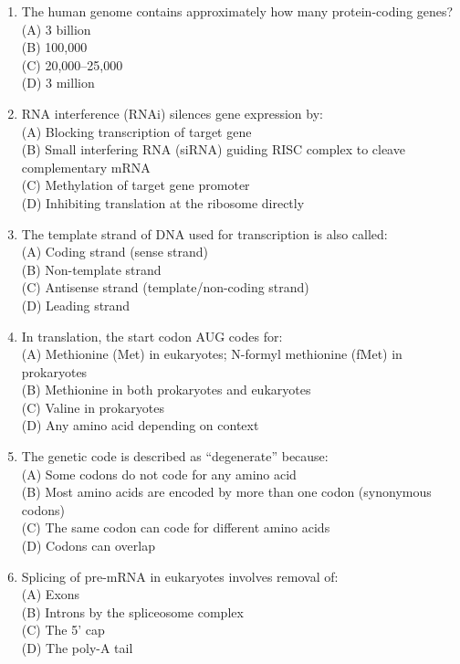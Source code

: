 \documentclass{article}
\begin{document}
\begin{enumerate}[label=Q\arabic*.]
\item The human genome contains approximately how many protein-coding genes?
\\(A) 3 billion
\\(B) 100,000
\\(C) 20,000--25,000
\\(D) 3 million

\item RNA interference (RNAi) silences gene expression by:
\\(A) Blocking transcription of target gene
\\(B) Small interfering RNA (siRNA) guiding RISC complex to cleave complementary mRNA
\\(C) Methylation of target gene promoter
\\(D) Inhibiting translation at the ribosome directly

\item The template strand of DNA used for transcription is also called:
\\(A) Coding strand (sense strand)
\\(B) Non-template strand
\\(C) Antisense strand (template/non-coding strand)
\\(D) Leading strand

\item In translation, the start codon AUG codes for:
\\(A) Methionine (Met) in eukaryotes; N-formyl methionine (fMet) in prokaryotes
\\(B) Methionine in both prokaryotes and eukaryotes
\\(C) Valine in prokaryotes
\\(D) Any amino acid depending on context

\item The genetic code is described as ``degenerate'' because:
\\(A) Some codons do not code for any amino acid
\\(B) Most amino acids are encoded by more than one codon (synonymous codons)
\\(C) The same codon can code for different amino acids
\\(D) Codons can overlap

\item Splicing of pre-mRNA in eukaryotes involves removal of:
\\(A) Exons
\\(B) Introns by the spliceosome complex
\\(C) The 5' cap
\\(D) The poly-A tail


\end{enumerate}
\end{document}
